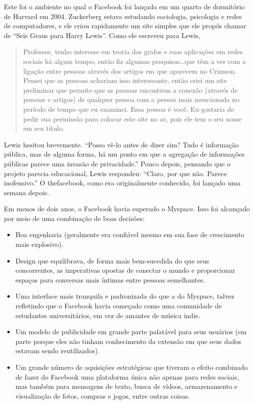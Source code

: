 Este foi o ambiente no qual o Facebook foi lançado em um quarto de dormitório de Harvard em
2004. Zuckerberg estava estudando sociologia, psicologia e redes de computadores, e ele criou
rapidamente um site simples que ele propôs chamar de ``Seis Graus para Harry Lewis''. Como ele
escreveu para Lewis,

\begin{quote}
    Professor, tenho interesse em teoria dos grafos e suas aplicações em redes sociais há algum
    tempo, então fiz algumas pesquisas\ldots que têm a ver com a ligação entre pessoas através
    dos artigos em que aparecem no Crimson. Pensei que as pessoas achariam isso interessante,
    então criei um site preliminar que permite que as pessoas encontrem a conexão (através de
    pessoas e artigos) de qualquer pessoa com a pessoa mais mencionada no período de tempo que
    eu examinei. Essa pessoa é você. Eu gostaria de pedir sua permissão para colocar este site
    no ar, pois ele tem o seu nome em seu título.
\end{quote}

Lewis hesitou brevemente. ``Posso vê-lo antes de dizer sim? Tudo é informação pública, mas de
alguma forma, há um ponto em que a agregação de informações públicas parece uma invasão de
privacidade.'' Pouco depois, pensando que o projeto parecia educacional, Lewis respondeu: ``Claro,
por que não. Parece inofensivo.'' O thefacebook, como era originalmente conhecido, foi lançado
uma semana depois.

Em menos de dois anos, o Facebook havia superado o Myspace. Isso foi alcançado por meio de uma
combinação de boas decisões:

\begin{itemize}
    \item Boa engenharia (geralmente era confiável mesmo em sua fase de crescimento mais explosivo).
    \item Design que equilibrava, de forma mais bem-sucedida do que seus concorrentes, as
        imperativas opostas de conectar o mundo e proporcionar espaços para conversas mais íntimas
        entre pessoas semelhantes.
    \item Uma interface mais tranquila e padronizada do que a do Myspace, talvez refletindo que o
        Facebook havia começado como uma comunidade de estudantes universitários, em vez de amantes de
        música indie.
    \item Um modelo de publicidade em grande parte palatável para seus usuários (em parte porque
        eles não tinham conhecimento da extensão em que seus dados estavam sendo reutilizados).
    \item Um grande número de aquisições estratégicas que tiveram o efeito combinado de fazer do
        Facebook uma plataforma única não apenas para redes sociais, mas também para mensagens de
        texto, busca de vídeos, armazenamento e visualização de fotos, compras e jogos, entre outras
        coisas.
\end{itemize}

